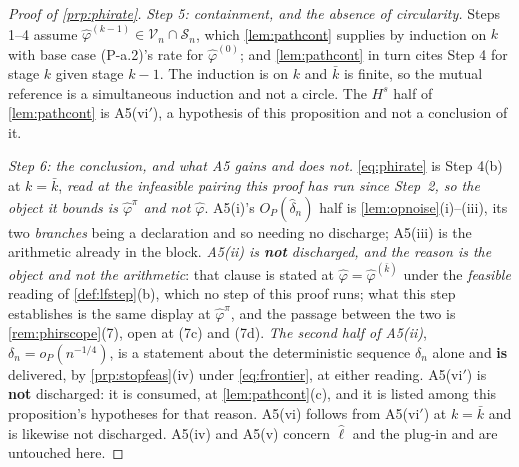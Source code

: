 \begin{proof}[Proof of \cref{prp:phirate}]
\emph{Step 5: containment, and the absence of circularity.} Steps 1--4 assume
$\hat\varphi^{(k-1)}\in\mathcal V_n\cap\mathcal S_n$, which \cref{lem:pathcont} supplies by induction
on $k$ with base case (P-a.2)'s rate for $\hat\varphi^{(0)}$; and \cref{lem:pathcont} in turn cites
Step 4 for stage $k$ given stage $k-1$. The induction is on $k$ and $\bar k$ is finite, so the
mutual reference is a simultaneous induction and not a circle. The $H^{s}$ half of
\cref{lem:pathcont} is A5(vi$'$), a hypothesis of this proposition and not a conclusion of it.

\emph{Step 6: the conclusion, and what A5 gains and does not.} \eqref{eq:phirate} is Step 4(b) at
$k=\bar k$, \emph{read at the infeasible pairing this proof has run since Step~2, so the object it
bounds is $\hat\varphi^{\pi}$ and not $\hat\varphi$}.
A5(i)'s $O_P(\hat\delta_n)$ half is \cref{lem:opnoise}(i)--(iii), its two \emph{branches} being a
declaration and so needing no discharge; A5(iii) is the arithmetic already in the
block. \emph{A5(ii) is \textbf{not} discharged, and the reason is the object and not the arithmetic}:
that clause is stated at $\hat\varphi=\hat\varphi^{(\bar k)}$ under the \emph{feasible} reading of
\cref{def:lfstep}\textup{(b)}, which no step of this proof runs; what this step establishes is the same
display at $\hat\varphi^{\pi}$, and the passage between the two is \cref{rem:phirscope}\textup{(7)},
open at \textup{(7c)} and \textup{(7d)}. \emph{The second half of A5(ii)},
$\delta_n=o_P(n^{-1/4})$, is a statement about the deterministic sequence $\delta_n$ alone and
\textbf{is} delivered, by \cref{prp:stopfeas}(iv) under \eqref{eq:frontier}, at either reading.
A5(vi$'$) is \textbf{not} discharged: it is consumed, at \cref{lem:pathcont}(c), and it is
listed among this proposition's hypotheses for that reason. A5(vi) follows from A5(vi$'$) at
$k=\bar k$ and is likewise not discharged. A5(iv) and A5(v) concern $\hat\ell$ and the plug-in and are
untouched here.
\end{proof}


